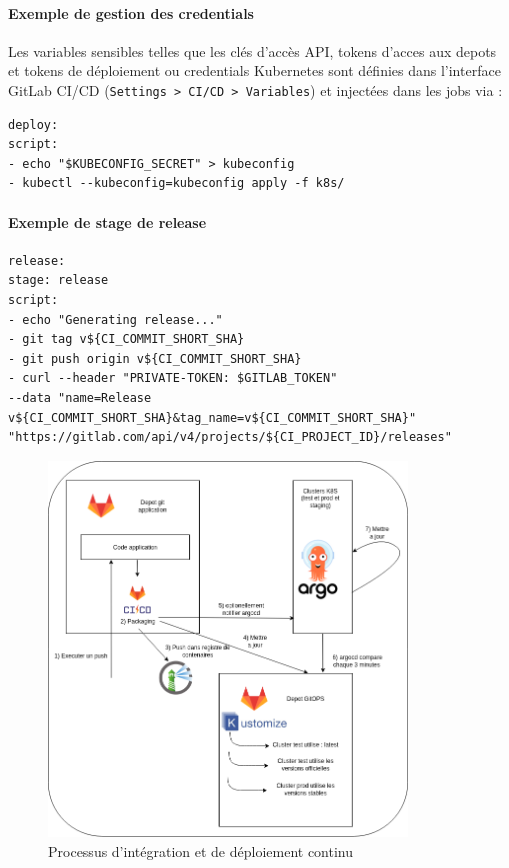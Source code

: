 \paragraph{Exemple de gestion des credentials}
Les variables sensibles telles que les clés d’accès API, tokens d'acces aux depots et tokens de déploiement ou credentials Kubernetes sont définies dans l’interface GitLab CI/CD (\texttt{Settings > CI/CD > Variables}) et injectées dans les jobs via :
\begin{verbatim}
deploy:
script:
- echo "$KUBECONFIG_SECRET" > kubeconfig
- kubectl --kubeconfig=kubeconfig apply -f k8s/
\end{verbatim}

\paragraph{Exemple de stage de release}
\begin{verbatim}
release:
stage: release
script:
- echo "Generating release..."
- git tag v${CI_COMMIT_SHORT_SHA}
- git push origin v${CI_COMMIT_SHORT_SHA}
- curl --header "PRIVATE-TOKEN: $GITLAB_TOKEN"
--data "name=Release v${CI_COMMIT_SHORT_SHA}&tag_name=v${CI_COMMIT_SHORT_SHA}"
"https://gitlab.com/api/v4/projects/${CI_PROJECT_ID}/releases"
\end{verbatim}

\begin{figure}[H]
	\centering
	\includegraphics[width=0.85\textwidth]{figures/gitlab-ci.png}
	\caption{Processus d'intégration et de déploiement continu}
\end{figure}

